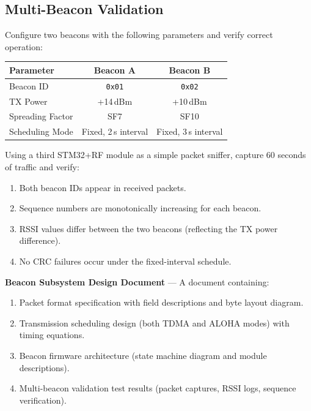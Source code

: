 \documentclass[11pt,letterpaper]{article}
\begin{document}
	\subsection{Multi-Beacon Validation}
	
	\begin{tcolorbox}[infobox={Exercise: Two-Beacon Concurrent Operation}]
		Configure two beacons with the following parameters and verify correct operation:
		
		\medskip
		\begin{tabular}{l c c}
			\toprule
			\textbf{Parameter} & \textbf{Beacon A} & \textbf{Beacon B} \\
			\midrule
			Beacon ID & \texttt{0x01} & \texttt{0x02} \\
			TX Power & +14\,dBm & +10\,dBm \\
			Spreading Factor & SF7 & SF10 \\
			Scheduling Mode & Fixed, 2\,s interval & Fixed, 3\,s interval \\
			\bottomrule
		\end{tabular}
		
		\medskip
		Using a third STM32+RF module as a simple packet sniffer, capture 60 seconds of traffic and verify:
		\begin{enumerate}
			\item Both beacon IDs appear in received packets.
			\item Sequence numbers are monotonically increasing for each beacon.
			\item RSSI values differ between the two beacons (reflecting the TX power difference).
			\item No CRC failures occur under the fixed-interval schedule.
		\end{enumerate}
	\end{tcolorbox}
	
	\begin{tcolorbox}[deliverable={Week 3 Deliverable}]
		\textbf{Beacon Subsystem Design Document} --- A document containing:
		\begin{enumerate}
			\item Packet format specification with field descriptions and byte layout diagram.
			\item Transmission scheduling design (both TDMA and ALOHA modes) with timing equations.
			\item Beacon firmware architecture (state machine diagram and module descriptions).
			\item Multi-beacon validation test results (packet captures, RSSI logs, sequence verification).
		\end{enumerate}
	\end{tcolorbox}
	
\end{document}
